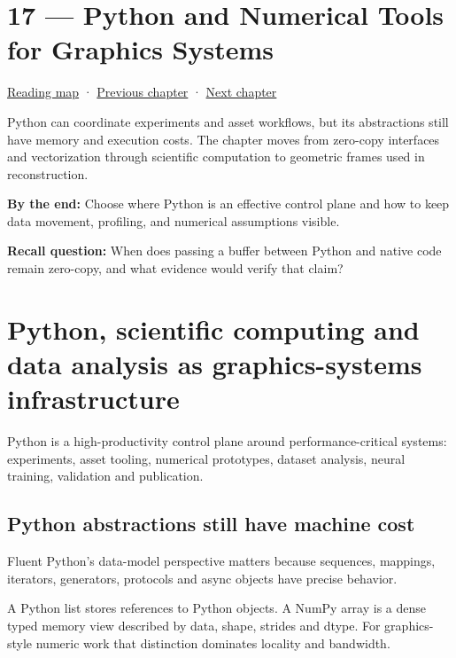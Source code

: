 \hypertarget{01-foundations-i-ch017}{}
\section{17 --- Python and Numerical Tools for Graphics Systems}\label{python-and-numerical-tools-for-graphics-systems}

\href{Chapter\%20Edition/01\%20-\%20Computing\%20Foundations/00\%20-\%20Reading\%20Map}{Reading map} · \hyperref[01-foundations-i-ch016]{Previous chapter} · \hyperref[01-foundations-i-ch018]{Next chapter}

Python can coordinate experiments and asset workflows, but its abstractions still have memory and execution costs. The chapter moves from zero-copy interfaces and vectorization through scientific computation to geometric frames used in reconstruction.

\textbf{By the end:} Choose where Python is an effective control plane and how to keep data movement, profiling, and numerical assumptions visible.

\textbf{Recall question:} When does passing a buffer between Python and native code remain zero-copy, and what evidence would verify that claim?

\section{Python, scientific computing and data analysis as graphics-systems infrastructure}\label{python-scientific-computing-and-data-analysis-as-graphics-systems-infrastructure}

Python is a high-productivity control plane around performance-critical systems: experiments, asset tooling, numerical prototypes, dataset analysis, neural training, validation and publication.

\subsection{Python abstractions still have machine cost}\label{python-abstractions-still-have-machine-cost}

Fluent Python's data-model perspective matters because sequences, mappings, iterators, generators, protocols and async objects have precise behavior.

A Python list stores references to Python objects. A NumPy array is a dense typed memory view described by data, shape, strides and dtype. For graphics-style numeric work that distinction dominates locality and bandwidth.

